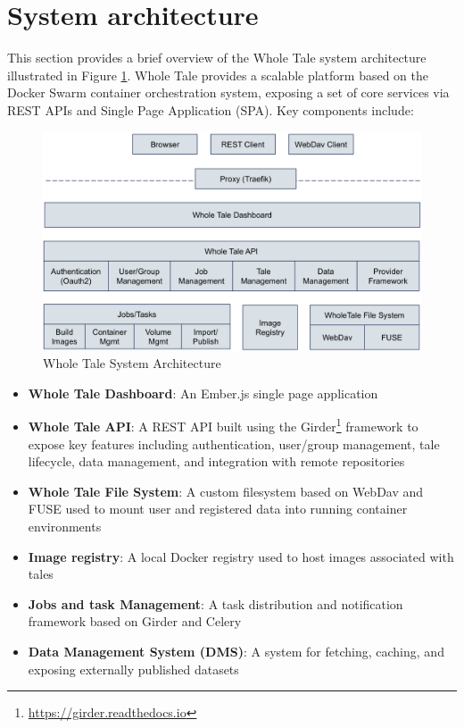 \documentclass[conference]{IEEEtran}
\begin{document}
\section{System architecture} \label{architecture}

This section provides a brief overview of the Whole Tale system architecture illustrated in Figure 
\ref{fig-architecture}. Whole Tale 
provides a scalable platform based on the Docker Swarm container orchestration system, exposing a 
set of core services via REST APIs and Single Page Application (SPA). Key components include:

\begin{figure}[h]
\centering
\includegraphics[scale=0.25]{images/wholetale-architecture.png}
\caption{Whole Tale System Architecture}
\label{fig-architecture}
\end{figure}

\begin{itemize}
\item{{\bf Whole Tale Dashboard}: An Ember.js single page application}
\item{{\bf Whole Tale API}: A REST API built using the Girder\footnote{\url{https://girder.readthedocs.io}} framework to expose key features including authentication, user/group management, tale lifecycle, data management, and integration with remote repositories}
\item{{\bf Whole Tale File System}: A custom filesystem based on WebDav and FUSE used to mount user and registered data into running container environments}
\item{{\bf Image registry}: A local Docker registry used to host images associated with tales}
\item{{\bf Jobs and task Management}: A task distribution and notification framework based on Girder and Celery}
\item{{\bf Data Management System (DMS)}: A system for fetching, caching, and exposing externally published datasets}
\end{itemize}
\end{document}
